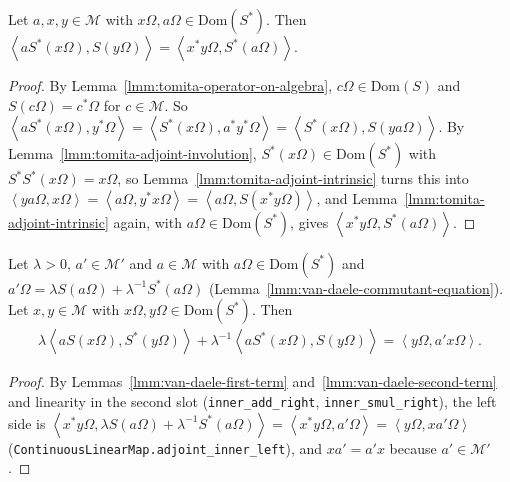 \begin{lemma}
    \label{lmm:van-daele-second-term}
    \leanok
    Let $a, x, y \in \mathcal{M}$ with $x\Omega, a\Omega \in \text{Dom}(S^*)$. Then $\left< aS^*(x\Omega), S(y\Omega) \right> = \left< x^*y\Omega, S^*(a\Omega) \right>$.
\end{lemma}
\begin{proof}
    \leanok
    By Lemma~\ref{lmm:tomita-operator-on-algebra}, $c\Omega \in \text{Dom}(S)$ and $S(c\Omega) = c^*\Omega$ for $c \in \mathcal{M}$. So $\left< aS^*(x\Omega), y^*\Omega \right> = \left< S^*(x\Omega), a^*y^*\Omega \right> = \left< S^*(x\Omega), S(ya\Omega) \right>$. By Lemma~\ref{lmm:tomita-adjoint-involution}, $S^*(x\Omega) \in \text{Dom}(S^*)$ with $S^*S^*(x\Omega) = x\Omega$, so Lemma~\ref{lmm:tomita-adjoint-intrinsic} turns this into $\left< ya\Omega, x\Omega \right> = \left< a\Omega, y^*x\Omega \right> = \left< a\Omega, S(x^*y\Omega) \right>$, and Lemma~\ref{lmm:tomita-adjoint-intrinsic} again, with $a\Omega \in \text{Dom}(S^*)$, gives $\left< x^*y\Omega, S^*(a\Omega) \right>$.
\end{proof}

\begin{lemma}
    \label{lmm:van-daele-identity-algebra}
    \leanok
    Let $\lambda > 0$, $a' \in \mathcal{M}'$ and $a \in \mathcal{M}$ with $a\Omega \in \text{Dom}(S^*)$ and $a'\Omega = \lambda S(a\Omega) + \lambda^{-1}S^*(a\Omega)$ (Lemma~\ref{lmm:van-daele-commutant-equation}). Let $x, y \in \mathcal{M}$ with $x\Omega, y\Omega \in \text{Dom}(S^*)$. Then
    \begin{align}
        \lambda\left< aS(x\Omega), S^*(y\Omega) \right> + \lambda^{-1}\left< aS^*(x\Omega), S(y\Omega) \right> = \left< y\Omega, a'x\Omega \right>.
    \end{align}
\end{lemma}
\begin{proof}
    \leanok
    By Lemmas~\ref{lmm:van-daele-first-term} and~\ref{lmm:van-daele-second-term} and linearity in the second slot (\texttt{inner\_add\_right}, \texttt{inner\_smul\_right}), the left side is $\left< x^*y\Omega, \lambda S(a\Omega) + \lambda^{-1}S^*(a\Omega) \right> = \left< x^*y\Omega, a'\Omega \right> = \left< y\Omega, xa'\Omega \right>$ (\texttt{ContinuousLinearMap.adjoint\_inner\_left}), and $xa' = a'x$ because $a' \in \mathcal{M}'$.
\end{proof}

